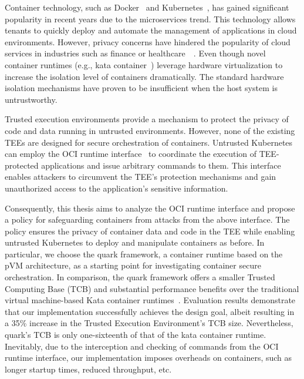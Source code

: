 




Container technology, such as Docker~\cite*{docker} and Kubernetes~\cite*{k8s}, has gained significant popularity in recent years due to the microservices trend. This technology allows tenants to quickly deploy and automate the management of applications in cloud environments. However, privacy concerns 
have hindered the popularity of cloud services in industries such as finance or healthcare~\cite*{data_privacy}~\cite*{eu_data_Privacy}. Even though novel container runtimes (e.g., kata container~\cite*{Kata-Containers}) leverage hardware virtualization to increase the isolation level of containers dramatically. The standard hardware isolation mechanisms have proven to be 
insufficient when the host system is untrustworthy.

Trusted execution environments provide a mechanism to protect the privacy of code and data running in untrusted environments. However, none of the existing TEEs are designed for secure orchestration of containers. Untrusted Kubernetes can employ the OCI runtime interface~\cite*{oci-runtime-spec} to coordinate the execution of 
TEE-protected applications and issue arbitrary commands to them. This interface enables attackers to circumvent the TEE's protection mechanisms and gain unauthorized access to the application's sensitive information.

Consequently, this thesis aims to analyze the OCI runtime interface and propose a policy for safeguarding containers from attacks from the above interface. The policy ensures the privacy of container data and code in the TEE while enabling untrusted Kubernetes to deploy and manipulate containers as 
before. In particular, we choose the quark framework, a container runtime based on the pVM architecture, as a starting point for investigating container secure orchestration. In comparison, the quark framework offers a smaller Trusted Computing Base (TCB) and substantial performance 
benefits over the traditional virtual machine-based Kata container runtimes~\cite*{quark_performance_report}. Evaluation results demonstrate that our implementation successfully achieves the design goal, albeit resulting in a 35\% increase in the Trusted Execution Environment's TCB size. Nevertheless, quark's TCB is only 
one-sixteenth of that of the kata container runtime. Inevitably, due to the interception and checking of commands from the OCI runtime interface, our implementation imposes overheads on containers, such as longer startup times, reduced throughput, etc.


